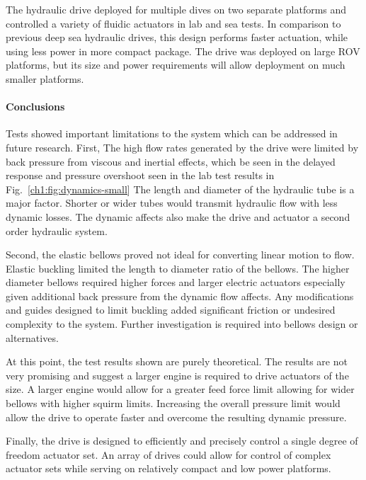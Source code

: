 The hydraulic drive deployed for multiple dives on two separate
platforms and controlled a variety of fluidic actuators in lab and sea
tests. In comparison to previous deep sea hydraulic drives, this design
performs faster actuation, while using less power in more compact
package. The drive was deployed on large \gls{ROV} platforms, but its size and
power requirements will allow deployment on much smaller platforms.

\hypertarget{ch1:conclusions}{%
\paragraph{Conclusions}\label{ch1:conclusions}}

Tests showed important limitations to the system which can be addressed
in future research. First, The high flow rates generated by the drive
were limited by back pressure from viscous and inertial effects, which
be seen in the delayed response and pressure overshoot seen in the lab
test results in Fig.~\ref{ch1:fig:dynamics-small} The length and diameter of
the hydraulic tube is a major factor. Shorter or wider tubes would
transmit hydraulic flow with less dynamic losses. The dynamic affects
also make the drive and actuator a second order hydraulic system.

Second, the elastic bellows proved not ideal for converting linear
motion to flow. Elastic buckling limited the length to diameter ratio of
the bellows. The higher diameter bellows required higher forces and
larger electric actuators especially given additional back pressure from
the dynamic flow affects. Any modifications and guides designed to limit
buckling added significant friction or undesired complexity to the
system. Further investigation is required into bellows design or
alternatives.

At this point, the test results shown are purely theoretical. The
results are not very promising and suggest a larger engine is required
to drive actuators of the size. A larger engine would allow for a
greater feed force limit allowing for wider bellows with higher squirm
limits. Increasing the overall pressure limit would allow the drive to
operate faster and overcome the resulting dynamic pressure.

Finally, the drive is designed to efficiently and precisely control a
single degree of freedom actuator set. An array of drives could allow
for control of complex actuator sets while serving on relatively compact
and low power platforms.

